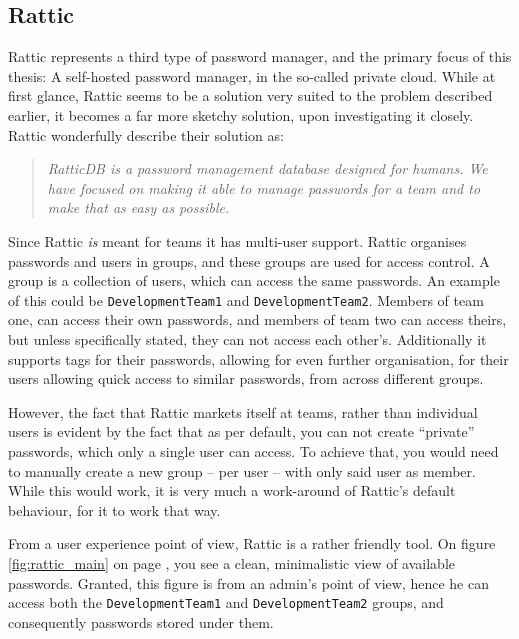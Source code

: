 		\subsection*{Rattic}
			\label{analysis:rattic}
			Rattic\cite{rattic_frontpage} represents a third type of password manager, and the primary focus of this thesis: A self-hosted password manager, in the so-called private cloud. While at first glance, Rattic seems to be a solution very suited to the problem described earlier, it becomes a far more sketchy solution, upon investigating it closely. Rattic wonderfully describe their solution as:

			\begin{quote}
				\emph{RatticDB is a password management database designed for humans. We have focused on making it able to manage passwords for a team and to make that as easy as possible.}\\\cite{rattic_frontpage}
			\end{quote}

			Since Rattic \emph{is} meant for teams it has multi-user support. Rattic organises passwords and users in groups, and these groups are used for access control. A group is a collection of users, which can access the same passwords. An example of this could be \verb=DevelopmentTeam1= and \verb=DevelopmentTeam2=. Members of team one, can access their own passwords, and members of team two can access theirs, but unless specifically stated, they can not access each other's. Additionally it supports tags for their passwords, allowing for even further organisation, for their users allowing quick access to similar passwords, from across different groups.

			However, the fact that Rattic markets itself at teams, rather than individual users is evident by the fact that as per default, you can not create ``private'' passwords, which only a single user can access. To achieve that, you would need to manually create a new group -- per user -- with only said user as member. While this would work, it is very much a work-around of Rattic's default behaviour, for it to work that way.

			From a user experience point of view, Rattic is a rather friendly tool. On figure \ref{fig:rattic_main} on page \pageref{fig:rattic_main}, you see a clean, minimalistic view of available passwords. Granted, this figure is from an admin's point of view, hence he can access both the \verb=DevelopmentTeam1= and \verb=DevelopmentTeam2= groups, and consequently passwords stored under them.

